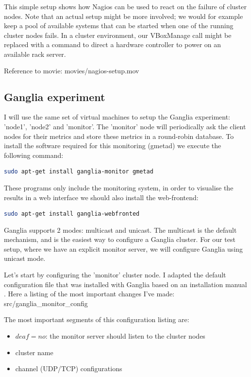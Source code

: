 \documentclass[12pt]{report}
\begin{document}
This simple setup shows how Nagios can be used to react on the failure
of cluster nodes. Note that an actual setup might be more
involved; we would for example keep a pool of available systems that
can be started when one of the running cluster nodes fails. In a
cluster environment, our VBoxManage call might be replaced with a
command to direct a hardware controller to power on an available rack
server.

Reference to movie: movies/nagios-setup.mov

\subsection{Ganglia experiment}
I will use the same set of virtual machines to setup the Ganglia
experiment: 'node1', 'node2' and 'monitor'.
The 'monitor' node will periodically ask the client nodes for their
metrics and store these metrics in a round-robin database.
To install the software required for this monitoring (gmetad) we execute the
following command:
\begin{lstlisting}[language=bash]
sudo apt-get install ganglia-monitor gmetad
\end{lstlisting} 

These programs only include the monitoring system, in order to
visualise the results in a web interface we should also install the
web-frontend:
\begin{lstlisting}[language=bash]
sudo apt-get install ganglia-webfronted
\end{lstlisting} 

Ganglia supports 2 modes: multicast and unicast.
The multicast is the default mechanism, and is the easiest way to
configure a Ganglia cluster.
For our test setup, where we have an explicit monitor server, we will
configure Ganglia using unicast mode.

Let's start by configuring the 'monitor' cluster node. I adapted the
default configuration file that was installed with Ganglia based on an
 installation manual \cite{ganglia_install_manual}.
Here a listing of the most important changes I've made:
src/ganglia\_monitor\_config

The most important segments of this configuration listing are:
\begin{itemize}
\item $deaf = no$: the monitor server should listen to the cluster
  nodes
\item cluster name
\item channel (UDP/TCP) configurations
\end{itemize}
\end{document}
